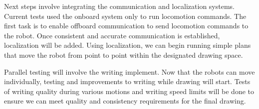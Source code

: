 Next steps involve integrating the communication and localization systems. Current tests used the onboard system only to run locomotion commands. The first task is to enable offboard communication to send locomotion commands to the robot. Once consistent and accurate communication is established, localization will be added. Using localization, we can begin running simple plans that move the robot from point to point within the designated drawing space.

Parallel testing will involve the writing implement. Now that the robots can move individually, testing and improvements to writing while drawing will start. Tests of writing quality during various motions and writing speed limits will be done to ensure we can meet quality and consistency requirements for the final drawing.

\clearpage
